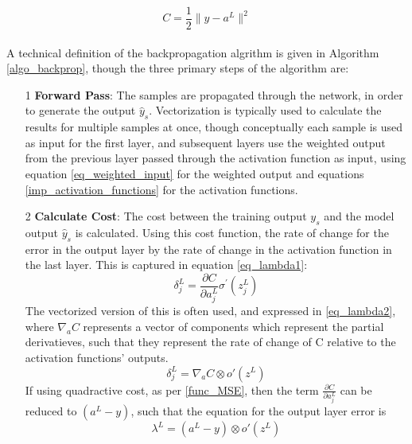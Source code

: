 \documentclass[a4paper,11pt,oneside]{article}
\theoremstyle{plain}
\theoremstyle{definition}
\begin{document}
\begin{equation}\label{func_MSE}
C = \frac{1}{2} \rVert y - a^L \rVert^2
\end{equation}
~\\

A technical definition of the backpropagation algrithm is given in Algorithm \ref{algo_backprop}, though the three primary steps of the algorithm are:\newline
\begin{itemize}
	\item [1] \textbf{Forward Pass}: The samples are propagated through the network, in order to generate the output $\hat{y}_s$. Vectorization is typically used to calculate the results for multiple samples at once, though conceptually each sample is used as input for the first layer, and subsequent layers use the weighted output from the previous layer passed through the activation function as input, using equation \eqref{eq_weighted_input} for the weighted output and equations \ref{imp_activation_functions} for the activation functions.
	
	\item [2] \textbf{Calculate Cost}: The cost between the training output $y_s$ and the model output $\hat{y}_s$ is calculated. Using this cost function, the rate of change for the error in the output layer by the rate of change in the activation function in the last layer. This is captured in equation \eqref{eq_lambda1}:	
		\begin{equation}\label{eq_lambda1}
		\delta_{j}^{L}=\frac{\partial C}{\partial a_{j}^{L}} \sigma^{\prime}\left(z_{j}^{L}\right)
		\end{equation}
	The vectorized version of this is often used, and expressed in \eqref{eq_lambda2}, where $\nabla_a C$ represents a vector of components which represent the partial derivatieves, such that they represent the rate of change of C relative to the activation functions' outputs.
		\begin{equation}\label{eq_lambda2}
		\delta_{j}^{L}=\nabla_a C \otimes o'(z^L)
		\end{equation}
	If using quadractive cost, as per \ref{func_MSE}, then the term $\frac{\partial C}{\partial a_{j}^{L}}$ can be reduced to $(a^L - y)$, such that the equation for the output layer error is
	\begin{equation}\label{eq_lambda3}
				\lambda^L = (a^L - y) \otimes o'(z^L)
	\end{equation}
		

\end{itemize}
\end{document}
